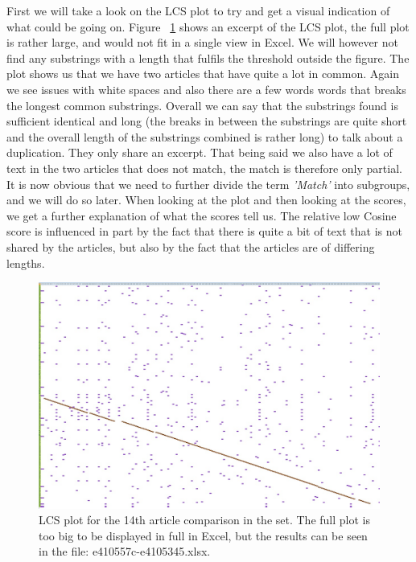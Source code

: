 First we will take a look on the LCS plot to try and get a visual indication of what could be going on. Figure ~\ref{ParticlaMatch} shows an excerpt of the LCS plot, the full plot is rather large, and would not fit in a single view in Excel. We will however not find any substrings with a length that fulfils the threshold outside the figure. The plot shows us that we have two articles that have quite a lot in common. Again we see issues with white spaces and also there are a few words words that breaks the longest common substrings. Overall we can say that the substrings found is sufficient identical and long (the breaks in between the substrings are quite short and the overall length of the substrings combined is rather long) to talk about a duplication. They only share an excerpt. That being said we also have a lot of text in the two articles that does not match, the match is therefore only partial. It is now obvious that we need to further divide the term \textit{'Match'} into subgroups, and we will do so later. When looking at the plot and then looking at the scores, we get a further explanation of what the scores tell us. The relative low Cosine score is influenced in part by the fact that there is quite a bit of text that is not shared by the articles, but also by the fact that the articles are of differing lengths.

\begin{figure}
	\centering
	\includegraphics[scale=0.3]{figures/e410557c}
	\caption{LCS plot for the 14th article comparison in the set. The full plot is too big to be displayed in full in Excel, but the results can be seen in the file: e410557c-e4105345.xlsx.}
	\label{ParticlaMatch}
\end{figure}

